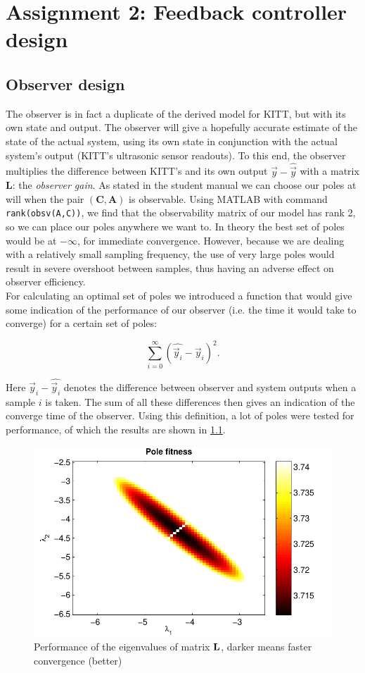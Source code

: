 \documentclass[11pt,titlepage]{report}
\begin{document}
\chapter{Assignment 2: Feedback controller design}
\section{Observer design}
The observer is in fact a duplicate of the derived model for KITT, but with its own state and output. The observer will give a hopefully accurate estimate of the state of the actual system, using its own state in conjunction with the actual system's output (KITT's ultrasonic sensor readouts). To this end, the observer multiplies the difference between KITT's and its own output $\vec{y}-\hat{\vec{y}}$ with a matrix $\mathbf{L}$: the \textit{observer gain}.
As stated in the student manual we can choose our poles at will when the pair $(\mathbf{C},\mathbf{A})$ is observable. Using MATLAB with command \texttt{rank(obsv(A,C))}, we find that the observability matrix of our model has rank \num{2}, so we can place our poles anywhere we want to. In theory the best set of poles would be at $-\infty$, for immediate convergence. However, because we are dealing with a relatively small sampling frequency, the use of very large poles would result in severe overshoot between samples, thus having an adverse effect on observer efficiency.
\\
For calculating an optimal set of poles we introduced a function that would give some indication of the performance of our observer (i.e. the time it would take to converge) for a certain set of poles:

\begin{equation}
	\sum_{i=0}^{\infty} (\hat{\vec{y}_i}-\vec{y}_i)^2.
\end{equation}

Here $\vec{y}_i-\hat{\vec{y}_i}$ denotes the difference between observer and system outputs when a sample $i$ is taken. The sum of all these differences then gives an indication of the converge time of the observer. Using this definition, a lot of poles were tested for performance, of which the results are shown in \ref{fig:ass2-eigs}.

\begin{figure}[H]
	\begin{center}
		\includegraphics[width=.7\linewidth]{resource/pole-fitness.pdf}
	\end{center}
	\caption{Performance of the eigenvalues of matrix $\mathbf{L}$, darker means faster convergence (better)}
	\label{fig:ass2-eigs}
\end{figure}
\end{document}
